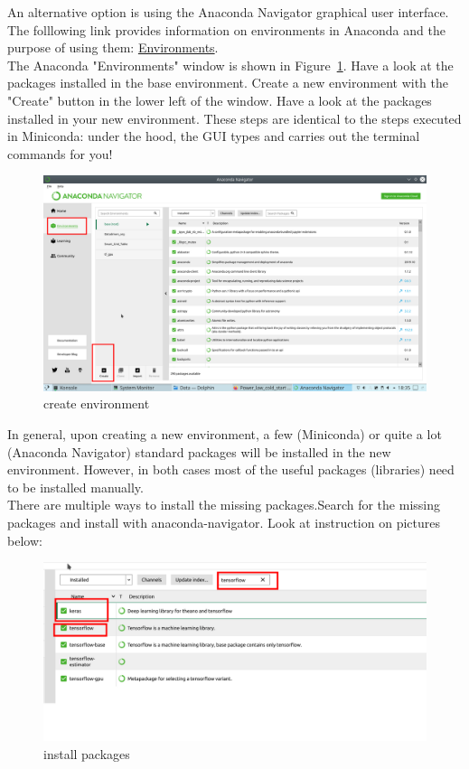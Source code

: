 \documentclass[a4paper,10pt]{article}
\begin{document}
An alternative option is using the Anaconda Navigator graphical user interface.
The folllowing link provides information on environments in Anaconda and the purpose of using them:
\href{https://protostar.space/why-you-need-python-environments-and-how-to-manage-them-with-conda}{Environments}.\\

The Anaconda "Environments" window is shown in Figure~\ref{fig:Anaconda_environment}. Have a look at the packages installed in the base environment. Create a new environment with the "Create" button in the lower left of the window. Have a look at the packages installed in your new environment.
These steps are identical to the steps executed in Miniconda: under the hood, the GUI types and carries out the terminal commands for you!

\begin{figure}[H]
\centering\includegraphics[width=1\columnwidth]{Pictures/env.png}
\caption[Short title]{create environment}
\label{fig:Anaconda_environment}\end{figure}


In general, upon creating a new environment, a few (Miniconda) or quite a lot (Anaconda Navigator) standard packages will be installed in the new environment. However, in both cases most of the useful packages (libraries) need to be installed manually.\\   
There are multiple ways to install the missing packages.Search for the missing packages and install with anaconda-navigator. Look at instruction on pictures below:

\vspace{5mm}
\begin{figure}[H]
\centering\includegraphics[width=1\columnwidth]{Pictures/packages.png}
\caption[Short title]{install packages}
\label{fig:ff3}\end{figure}
\end{document}
